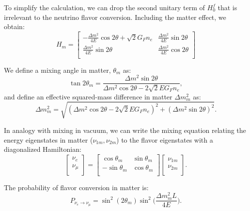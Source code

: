 \documentclass[preprint,12pt]{elsarticle}
\numberwithin{equation}{section}
\begin{document}
To simplify the calculation, we can drop the second unitary term of $H^f_0$ that is irrelevant to the neutrino flavor conversion. Including the matter effect, we obtain:
\begin{equation}\label{eq:Hm}
H_m = \begin{bmatrix}
-\frac{\Delta m^2}{4E}\cos 2\theta+\sqrt 2G_Fn_e & \frac{\Delta m^2}{4E}\sin 2\theta\\
\frac{\Delta m^2}{4E}\sin 2\theta &\frac{\Delta m^2}{4E}\cos 2\theta\\
\end{bmatrix}
\end{equation}

We define a mixing angle in matter, $\theta_m$ as:
\begin{equation}\label{eq:thetaM}
\tan 2\theta_m = \frac{\Delta m^2\sin2\theta}{\Delta m^2\cos2\theta-2\sqrt 2E G_Fn_e},
\end{equation}
and define an effective squared-mass difference in matter $\Delta m^2_m$ as:
\begin{equation}
\Delta m^2_m = \sqrt{(\Delta m^2\cos2\theta - 2\sqrt 2EG_Fn_e)^2+(\Delta m^2\sin2\theta)^2}.
\end{equation}

In analogy with mixing in vacuum, we can write the mixing equation relating the energy eigenstates in matter ($\nu_{1m},\nu_{2m}$) to the flavor eigenstates with a diagonalized Hamiltonian:
\begin{equation}\label{eq:matter_mixing}
\begin{bmatrix}
\nu_e\\
\nu_\mu\\
\end{bmatrix}
= \begin{bmatrix}
\cos\theta_m & \sin\theta_m\\
-\sin\theta_m & \cos\theta_m \\
\end{bmatrix}
\begin{bmatrix}
\nu_{1m}\\
\nu_{2m}\\
\end{bmatrix}.
\end{equation}

The probability of flavor conversion in matter is:
\begin{equation}
P_{\nu_e\to\nu_{\mu}}=\sin^2(2\theta_m)\sin^2\Big(\frac{\Delta m_m^2L}{4E}\Big).
\end{equation}
\end{document}
